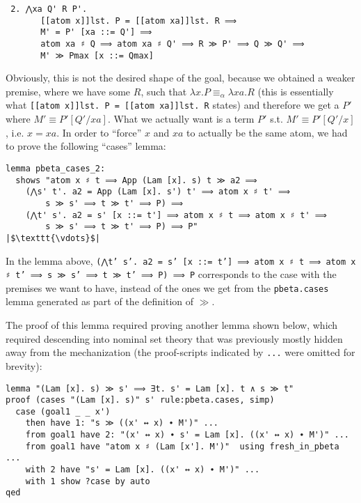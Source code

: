 \documentclass[a4paper, 12pt, twoside]{style/ociamthesis}
\theoremstyle{plain}
\theoremstyle{definition}
\theoremstyle{remark}
\begin{document}
\begin{verbatim}
 2. ⋀xa Q' R P'.
       [[atom x]]lst. P = [[atom xa]]lst. R ⟹
       M' = P' [xa ::= Q'] ⟹
       atom xa ♯ Q ⟹ atom xa ♯ Q' ⟹ R ≫ P' ⟹ Q ≫ Q' ⟹ 
       M' ≫ Pmax [x ::= Qmax]
\end{verbatim}

Obviously, this is not the desired shape of the goal, because we
obtained a weaker premise, where we have some \(R\), such that
\(\lambda x. P \equiv_\alpha \lambda xa. R\) (this is essentially what
\texttt{[[atom x]]lst. P = [[atom xa]]lst. R} states) and therefore we
get a \(P'\) where \(M' \equiv P'[Q'/xa]\). What we actually want is a
term \(P'\) s.t. \(M' \equiv P'[Q'/x]\), i.e. \(x = xa\). In order to
``force'' \(x\) and \(xa\) to actually be the same atom, we had to prove
the following ``cases'' lemma:

\begin{verbatim}
lemma pbeta_cases_2:
  shows "atom x ♯ t ⟹ App (Lam [x]. s) t ≫ a2 ⟹ 
    (⋀s' t'. a2 = App (Lam [x]. s') t' ⟹ atom x ♯ t' ⟹ 
        s ≫ s' ⟹ t ≫ t' ⟹ P) ⟹
    (⋀t' s'. a2 = s' [x ::= t'] ⟹ atom x ♯ t ⟹ atom x ♯ t' ⟹ 
        s ≫ s' ⟹ t ≫ t' ⟹ P) ⟹ P"
|$\texttt{\vdots}$|
\end{verbatim}

In the lemma above,
\texttt{(⋀t' s'. a2 = s' [x ::= t'] ⟹ atom x ♯ t ⟹ atom x ♯ t' ⟹ s ≫ s' ⟹ t ≫ t' ⟹ P) ⟹ P}
corresponds to the case with the premises we want to have, instead of
the ones we get from the \texttt{pbeta.cases} lemma generated as part of
the definition of \(\gg\).

The proof of this lemma required proving another lemma shown below,
which required descending into nominal set theory that was previously
mostly hidden away from the mechanization (the proof-scripts indicated
by \texttt{...} were omitted for brevity):

\begin{verbatim}
lemma "(Lam [x]. s) ≫ s' ⟹ ∃t. s' = Lam [x]. t ∧ s ≫ t"
proof (cases "(Lam [x]. s)" s' rule:pbeta.cases, simp)
  case (goal1 _ _ x')
    then have 1: "s ≫ ((x' ↔ x) ∙ M')" ...
    from goal1 have 2: "(x' ↔ x) ∙ s' = Lam [x]. ((x' ↔ x) ∙ M')" ...
    from goal1 have "atom x ♯ (Lam [x']. M')"  using fresh_in_pbeta ...
    with 2 have "s' = Lam [x]. ((x' ↔ x) ∙ M')" ...
    with 1 show ?case by auto
qed
\end{verbatim}
\end{document}
